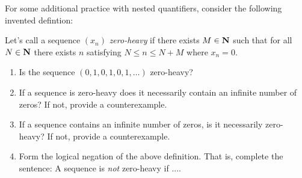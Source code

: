 \documentclass{lew98_solutions}
\begin{document}
\begin{exercise}
\label{ex:2.2.8}
    For some additional practice with nested quantifiers, consider the following invented defintion:

    Let's call a sequence \( (x_n) \) \textit{zero-heavy} if there exists \( M \in \mathbf{N} \) such that for all \( N \in \mathbf{N} \) there exists \( n \) satisfying \( N \leq n \leq N + M \) where \( x_n = 0 \).
    \begin{enumerate}
        \item Is the sequence \( (0, 1, 0, 1, 0, 1, \ldots) \) zero-heavy?

        \item If a sequence is zero-heavy does it necessarily contain an infinite number of zeros? If not, provide a counterexample.

        \item If a sequence contains an infinite number of zeros, is it necessarily zero-heavy? If not, provide a counterexample.

        \item Form the logical negation of the above definition. That is, complete the sentence: A sequence is \textit{not} zero-heavy if ....
    \end{enumerate}
\end{exercise}
\end{document}
